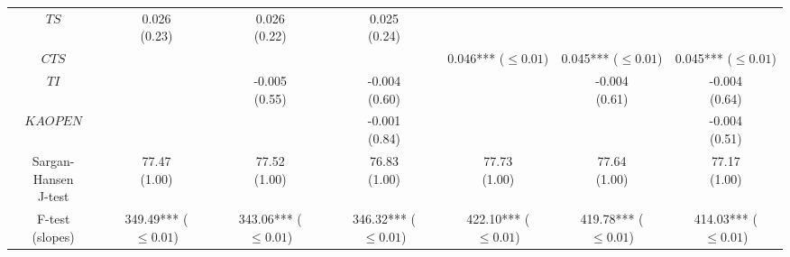 \begin{tabular}{ccccccc}
                                          $TS$ &             \makecell{0.026\\(0.23)} &             \makecell{0.026\\(0.22)} &             \makecell{0.025\\(0.24)} &                                      &                                      &                                      \\
                                         $CTS$ &                                      &                                      &                                      &   \makecell{0.046***\\($\leq 0.01$)} &   \makecell{0.045***\\($\leq 0.01$)} &   \makecell{0.045***\\($\leq 0.01$)} \\
                                          $TI$ &                                      &            \makecell{-0.005\\(0.55)} &            \makecell{-0.004\\(0.60)} &                                      &            \makecell{-0.004\\(0.61)} &            \makecell{-0.004\\(0.64)} \\
                                      $KAOPEN$ &                                      &                                      &            \makecell{-0.001\\(0.84)} &                                      &                                      &            \makecell{-0.004\\(0.51)} \\
              \makecell{Sargan-Hansen\\J-test} &             \makecell{77.47\\(1.00)} &             \makecell{77.52\\(1.00)} &             \makecell{76.83\\(1.00)} &             \makecell{77.73\\(1.00)} &             \makecell{77.64\\(1.00)} &             \makecell{77.17\\(1.00)} \\
                   \makecell{F-test\\(slopes)} &  \makecell{349.49***\\($\leq 0.01$)} &  \makecell{343.06***\\($\leq 0.01$)} &  \makecell{346.32***\\($\leq 0.01$)} &  \makecell{422.10***\\($\leq 0.01$)} &  \makecell{419.78***\\($\leq 0.01$)} &  \makecell{414.03***\\($\leq 0.01$)} \\

\end{tabular}

